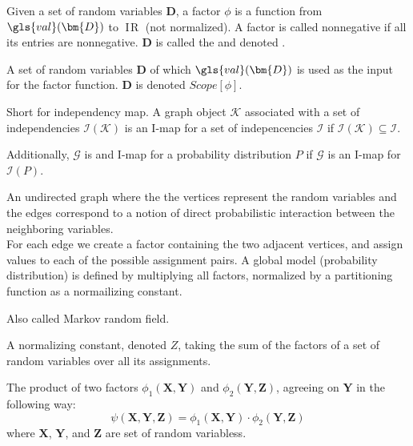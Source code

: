 \DeclareMathOperator*{\realnumbers}{\mathrm{I\!R}}


{%
  Given a \gls{set of random variables} $\bm{D}$, a factor $\phi$ is a function from $\gls{val}(\bm{D})$ to $\realnumbers$ (not normalized). A factor is called nonnegative if all its entries are nonnegative. $\bm{D}$ is called the  and denoted .
}

{%
  A \gls{set of random variables} $\bm{D}$ of which $\gls{val}(\bm{D})$ is used as the input for the \gls{factor} function. $\bm{D}$ is denoted $Scope[\phi]$.
}

{%
  Short for independency map. A graph object $\mathcal{K}$ associated with a \gls{set of independencies} $\mathcal{I}(\mathcal{K})$ is an I-map for a set of indepencencies $\mathcal{I}$ if $\mathcal{I}(\mathcal{K})\subseteq\mathcal{I}$.

  Additionally, $\mathcal{G}$ is and I-map for a \gls{probability distribution} $P$ if $\mathcal{G}$ is an I-map for $\mathcal{I}(P)$.

}

{%
  An undirected graph where the the vertices represent the \glspl{random variable} and the edges correspond to a notion of direct probabilistic interaction between the neighboring variables.\\

  For each edge we create a \gls{factor} containing the two adjacent vertices, and assign values to each of the possible assignment pairs. A global model (probability distribution) is defined by multiplying all factors, normalized by a \gls{partitioning function} as a normailizing constant.

  Also called Markov random field.

}

{%
  A normalizing constant, denoted $Z$, taking the sum of the \glspl{factor} of a \gls{set of random variables} over all its assignments.
}

{%
  The product of two \glspl{factor} $\phi_1(\bm{X},\bm{Y})$ and $\phi_2(\bm{Y},\bm{Z})$, agreeing on $\bm{Y}$ in the following way:
  \begin{equation*}
    \psi(\bm{X},\bm{Y},\bm{Z})=\phi_1(\bm{X},\bm{Y})\cdot\phi_2(\bm{Y},\bm{Z})
  \end{equation*}
  where $\bm{X}$, $\bm{Y}$, and $\bm{Z}$ are \glspl{set of random variables}.
}

